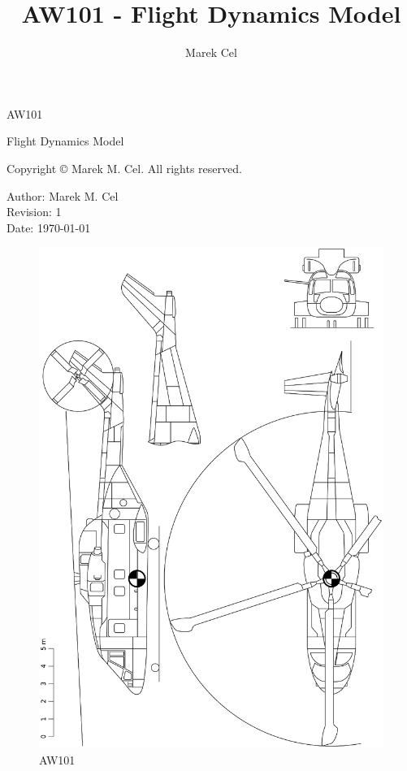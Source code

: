 \documentclass[12pt,a4paper]{article}
\title{AW101 - Flight Dynamics Model}
\author{Marek Cel}
\date{}
\begin{document}
  
  \begin{titlepage}
    \centering
    {\huge AW101 \par Flight Dynamics Model\par}
  \end{titlepage}
  

  \noindent Copyright \copyright{} \the\year{} Marek M. Cel. All rights reserved.

  \noindent Author: Marek M. Cel \\
  Revision: 1 \\
  Date: \today

  
  \clearpage
  \thispagestyle{empty}
  
  \begin{figure}[p]
    \centering
    \includegraphics[width=200mm]{eps/aw101_3view.eps}
    \caption{AW101}
  \end{figure}
\end{document}
